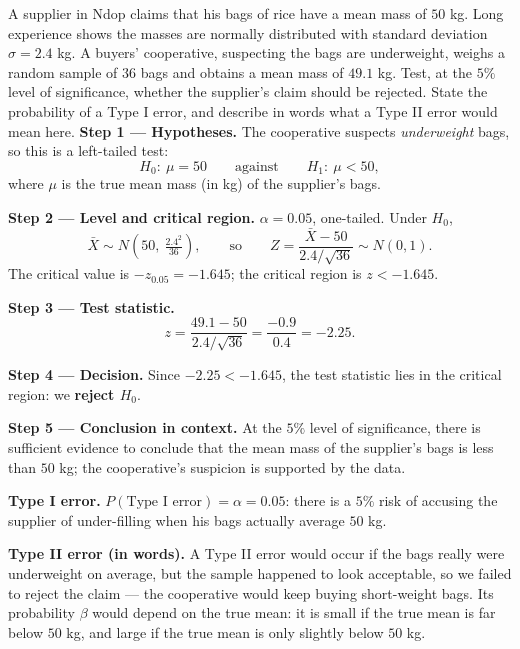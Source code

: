 \documentclass[11pt]{article}
\begin{document}
\begin{exoresolu}
A supplier in Ndop claims that his bags of rice have a mean mass of $50$ kg. Long experience shows the masses are normally distributed with standard deviation $\sigma = 2.4$ kg. A buyers' cooperative, suspecting the bags are underweight, weighs a random sample of $36$ bags and obtains a mean mass of $49.1$ kg. Test, at the $5\%$ level of significance, whether the supplier's claim should be rejected. State the probability of a Type I error, and describe in words what a Type II error would mean here.
\tcblower
\textbf{Step 1 --- Hypotheses.} The cooperative suspects \emph{underweight} bags, so this is a left-tailed test:
\[ H_0:\ \mu = 50 \qquad\text{against}\qquad H_1:\ \mu < 50, \]
where $\mu$ is the true mean mass (in kg) of the supplier's bags.

\textbf{Step 2 --- Level and critical region.} $\alpha = 0.05$, one-tailed. Under $H_0$,
\[ \bar{X}\sim N\!\left(50,\ \tfrac{2.4^2}{36}\right), \qquad\text{so}\qquad Z=\frac{\bar{X}-50}{2.4/\sqrt{36}}\sim N(0,1). \]
The critical value is $-z_{0.05}=-1.645$; the critical region is $z<-1.645$.

\textbf{Step 3 --- Test statistic.}
\[ z=\frac{49.1-50}{2.4/\sqrt{36}}=\frac{-0.9}{0.4}=-2.25. \]

\textbf{Step 4 --- Decision.} Since $-2.25<-1.645$, the test statistic lies in the critical region: we \textbf{reject $H_0$}.

\textbf{Step 5 --- Conclusion in context.} At the $5\%$ level of significance, there is sufficient evidence to conclude that the mean mass of the supplier's bags is less than $50$ kg; the cooperative's suspicion is supported by the data.

\textbf{Type I error.} $P(\text{Type I error})=\alpha=0.05$: there is a $5\%$ risk of accusing the supplier of under-filling when his bags actually average $50$ kg.

\textbf{Type II error (in words).} A Type II error would occur if the bags really were underweight on average, but the sample happened to look acceptable, so we failed to reject the claim --- the cooperative would keep buying short-weight bags. Its probability $\beta$ would depend on the true mean: it is small if the true mean is far below $50$ kg, and large if the true mean is only slightly below $50$ kg.
\end{exoresolu}
\end{document}
